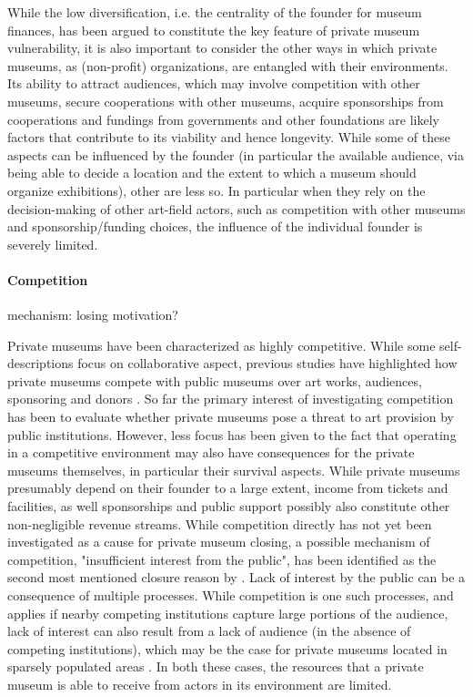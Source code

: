 \documentclass[12pt]{article}
\begin{document}
While the low diversification, i.e. the centrality of the founder for museum finances, has been argued to constitute the key feature of private museum vulnerability, it is also important to consider the other ways in which private museums, as (non-profit) organizations, are entangled with their environments.
Its ability to attract audiences, which may involve competition with other museums, secure cooperations with other museums, acquire sponsorships from cooperations and fundings from governments and other foundations are likely factors that contribute to its viability and hence longevity.
While some of these aspects can be influenced by the founder (in particular the available audience, via being able to decide a location and the extent to which a museum should organize exhibitions), other are less so.
In particular when they rely on the decision-making of other art-field actors, such as competition with other museums and sponsorship/funding choices, the influence of the individual founder is severely limited.
\paragraph*{Competition}




mechanism: losing motivation?


Private museums have been characterized as highly competitive.
While some self-descriptions focus on collaborative aspect, previous studies have highlighted how private museums compete with public museums over art works, audiences, sponsoring and donors \parencite[p.4]{Kolbe_etal_2022_privatemuseum}. 
So far the primary interest of investigating competition has been to evaluate whether private museums pose a threat to art provision by public institutions.
However, less focus has been given to the fact that operating in a competitive environment may also have consequences for the private museums themselves, in particular their survival aspects.
While private museums presumably depend on their founder to a large extent, income from tickets and facilities, as well sponsorships and public support possibly also constitute other non-negligible revenue streams.
While competition directly has not yet been investigated as a cause for private museum closing, a possible mechanism of competition, "insufficient interest from the public", has been identified as the second most mentioned closure reason by \textcite[p.6]{Velthuis_Gera_2024_fragility}. 
Lack of interest by the public can be a consequence of multiple processes.
While competition is one such processes, and applies if nearby competing institutions capture large portions of the audience, lack of interest can also result from a lack of audience (in the absence of competing institutions), which may be the case for private museums located in sparsely populated areas \parencite{Foster_2015_cube}.
In both these cases, the resources that a private museum is able to receive from actors in its environment are limited. 
\end{document}
